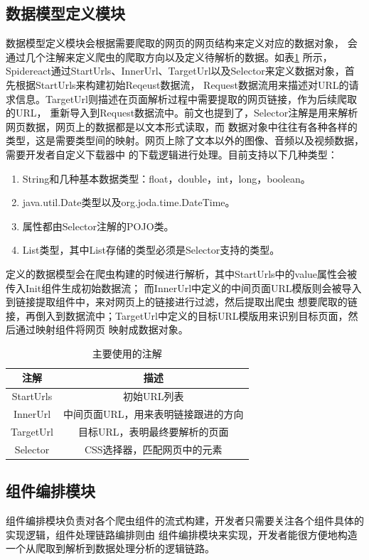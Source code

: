 \documentclass[master]{njuthesis}
\begin{document}
\subsection{数据模型定义模块}
数据模型定义模块会根据需要爬取的网页的网页结构来定义对应的数据对象，
会通过几个注解来定义爬虫的爬取方向以及定义待解析的数据。如表\ref{table:annotation} 所示，
Spidereact通过StartUrls、InnerUrl、TargetUrl以及Selector来定义数据对象，首先根据StartUrls来构建初始Reqeust数据流， Request数据流用来描述对URL的请求信息。TargetUrl则描述在页面解析过程中需要提取的网页链接，作为后续爬取的URL，
重新导入到Request数据流中。前文也提到了，Selector注解是用来解析网页数据，网页上的数据都是以文本形式读取，而
数据对象中往往有各种各样的类型，这是需要类型间的映射。网页上除了文本以外的图像、音频以及视频数据，需要开发者自定义下载器中
的下载逻辑进行处理。目前支持以下几种类型：

  \begin{enumerate}
    \item String和几种基本数据类型：float，double，int，long，boolean。
    \item java.util.Date类型以及org.joda.time.DateTime。
    \item 属性都由Selector注解的POJO类。
    \item List类型，其中List存储的类型必须是Selector支持的类型。
  \end{enumerate}


定义的数据模型会在爬虫构建的时候进行解析，其中StartUrls中的value属性会被传入Init组件生成初始数据流；
而InnerUrl中定义的中间页面URL模版则会被导入到链接提取组件中，来对网页上的链接进行过滤，然后提取出爬虫
想要爬取的链接，再倒入到数据流中；TargetUrl中定义的目标URL模版用来识别目标页面，然后通过映射组件将网页
映射成数据对象。


\begin{table}
\centering
\begin{tabular}{|c|c|}
\hline
注解 & 描述 \\
\hline
StartUrls & 初始URL列表 \\
InnerUrl & 中间页面URL，用来表明链接跟进的方向 \\
TargetUrl & 目标URL，表明最终要解析的页面\\
Selector & CSS选择器，匹配网页中的元素\\
\hline
\end{tabular}
\caption{主要使用的注解}\label{table:annotation}
\end{table}

\subsection{组件编排模块}
组件编排模块负责对各个爬虫组件的流式构建，开发者只需要关注各个组件具体的实现逻辑，组件处理链路编排则由
组件编排模块来实现，开发者能很方便地构造一个从爬取到解析到数据处理分析的逻辑链路。
\end{document}

